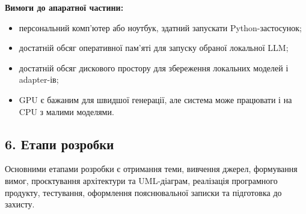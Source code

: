 \textbf{Вимоги до апаратної частини:}
\begin{itemize}
  \item персональний комп'ютер або ноутбук, здатний запускати Python-застосунок;
  \item достатній обсяг оперативної пам'яті для запуску обраної локальної LLM;
  \item достатній обсяг дискового простору для збереження локальних моделей і adapter-ів;
  \item GPU є бажаним для швидшої генерації, але система може працювати і на CPU з малими моделями.
\end{itemize}

\subsection*{6. Етапи розробки}

Основними етапами розробки є отримання теми, вивчення джерел, формування вимог, проєктування архітектури та UML-діаграм, реалізація програмного продукту, тестування, оформлення пояснювальної записки та підготовка до захисту.

